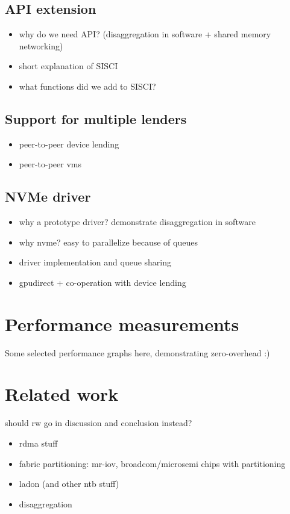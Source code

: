 \subsection{API extension}\label{sec:api}
\begin{itemize}
    \item why do we need API? (disaggregation in software + shared memory networking)
    \item short explanation of SISCI
    \item what functions did we add to SISCI?
\end{itemize}

\subsection{Support for multiple lenders}
\begin{itemize}
    \item peer-to-peer device lending
    \item peer-to-peer vms
\end{itemize}


\subsection{NVMe driver}\label{sec:nvme}
\begin{itemize}
    \item why a prototype driver? demonstrate disaggregation in software
    \item why nvme? easy to parallelize because of queues
    \item driver implementation and queue sharing
    \item gpudirect + co-operation with device lending
\end{itemize}


\section{Performance measurements}\label{sec:eval}
Some selected performance graphs here, demonstrating zero-overhead :)

\section{Related work}\label{sec:rw}
should rw go in discussion and conclusion instead?
\begin{itemize}
    \item rdma stuff
    \item fabric partitioning: mr-iov, broadcom/microsemi chips with partitioning
    \item ladon (and other ntb stuff)
    \item disaggregation
\end{itemize}

